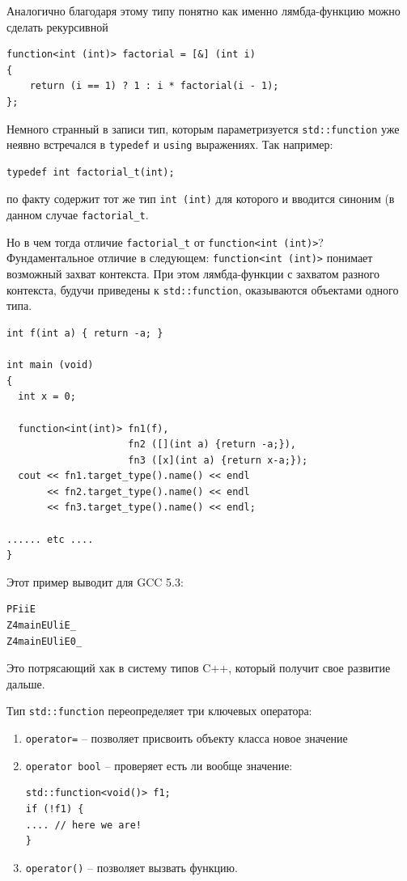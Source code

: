 \documentclass[a4paper,12pt,oneside]{article}
\begin{document}
Аналогично благодаря этому типу понятно как именно лямбда-функцию можно сделать рекурсивной

\begin{lstlisting}
function<int (int)> factorial = [&] (int i) 
{ 
    return (i == 1) ? 1 : i * factorial(i - 1); 
};
\end{lstlisting}

Немного странный в записи тип, которым параметризуется \lstinline!std::function! уже неявно встречался в \lstinline!typedef! и \lstinline!using! выражениях. Так например:

\begin{lstlisting}
typedef int factorial_t(int);
\end{lstlisting}

по факту содержит тот же тип \lstinline!int (int)! для которого и вводится синоним (в данном случае \lstinline!factorial_t!.

Но в чем тогда отличие \lstinline!factorial_t! от \lstinline!function<int (int)>!? Фундаментальное отличие в следующем: \lstinline!function<int (int)>! понимает возможный захват контекста. При этом лямбда-функции с захватом разного контекста, будучи приведены к \lstinline!std::function!, оказываются объектами одного типа.

\begin{lstlisting}
int f(int a) { return -a; }

int main (void)
{
  int x = 0;

  function<int(int)> fn1(f),
                     fn2 ([](int a) {return -a;}),
                     fn3 ([x](int a) {return x-a;});
  cout << fn1.target_type().name() << endl
       << fn2.target_type().name() << endl
       << fn3.target_type().name() << endl;

...... etc ....
}
\end{lstlisting}

Этот пример выводит для GCC 5.3: 

\begin{verbatim}
PFiiE
Z4mainEUliE_
Z4mainEUliE0_
\end{verbatim}

Это потрясающий хак в систему типов C++, который получит свое развитие дальше.

Тип \lstinline!std::function! переопределяет три ключевых оператора:

\begin{enumerate}
\item\lstinline!operator=! -- позволяет присвоить объекту класса новое значение

\item\lstinline!operator bool! -- проверяет есть ли вообще значение:

\begin{lstlisting}
std::function<void()> f1;
if (!f1) {
.... // here we are!
}
\end{lstlisting}

\item\lstinline!operator()! -- позволяет вызвать функцию.
\end{enumerate}
\end{document}
